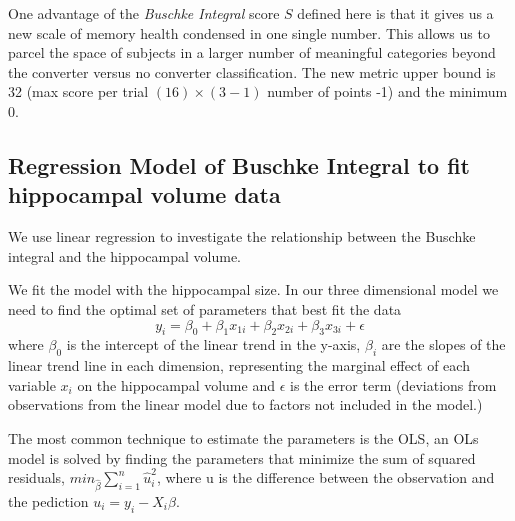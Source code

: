\documentclass[11pt]{article}
\theoremstyle{definition}
\theoremstyle{remark}
\begin{document}
One advantage of the \emph{Buschke Integral} score $S$ defined here is that it gives us a new scale of memory health condensed in one single number. This allows us to parcel the space of subjects in a larger number of meaningful categories beyond the converter versus no converter classification. The new metric upper bound is 32 (max score per trial $(16)\times (3-1)$ number of points -1) and the minimum 0.



\subsection{Regression Model of Buschke Integral to fit hippocampal volume data}
We use linear regression to investigate the relationship between the Buschke integral and the hippocampal volume.

We fit the model with the hippocampal size. In our three dimensional model we need to find the optimal set of parameters that best fit the data
\begin{equation}
y_i = \beta_0+ \beta_1 x_{1i} + \beta_2 x_{2i} + \beta_3 x_{3i} +  \epsilon
\end{equation}
where $\beta_0$ is the intercept of the linear trend in the y-axis, $\beta_i$ are the slopes of the linear trend line in each dimension, representing the marginal effect of each variable $x_i$ on the hippocampal volume and $\epsilon$ is the error term (deviations from observations from the linear model due to factors not included in the model.)

The most common technique to estimate the parameters is the OLS, an OLs model is solved by finding the parameters that minimize the sum of squared residuals, $min_{\hat{\beta}}\sum_{i=1}^{n} \hat{u}_{i}^{2}$, where u is the difference between the observation and the pediction $u_i = y_i - X_i\beta$.



\newpage
{}




\end{document}
